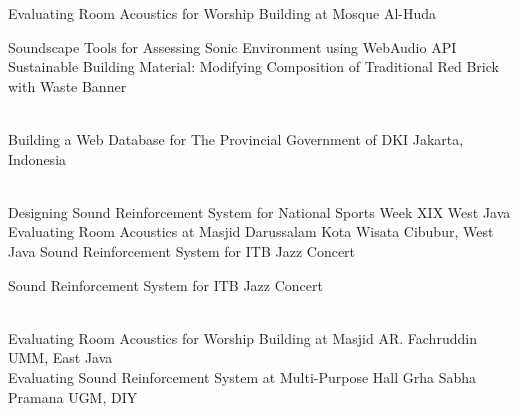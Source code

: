 \documentclass[]{style}
\begin{document}
 Evaluating Room Acoustics for Worship Building at Mosque Al-Huda \\
\sectionsep

 Soundscape Tools for Assessing Sonic Environment using WebAudio API \hfill{} \\
 Sustainable Building Material: Modifying Composition of Traditional Red Brick with Waste Banner \\
\sectionsep

\hfill{} \\
 Building a Web Database for The Provincial Government of DKI Jakarta, Indonesia\\
\sectionsep

\hfill{}\\
 Designing Sound Reinforcement System for National Sports Week XIX West Java\\
 Evaluating Room Acoustics at Masjid Darussalam Kota Wisata Cibubur, West Java
 Sound Reinforcement System for ITB Jazz Concert
\sectionsep

 Sound Reinforcement System for ITB Jazz Concert \hfill{}
\sectionsep

\hfill{}\\
 Evaluating Room Acoustics for Worship Building at Masjid AR. Fachruddin UMM, East Java\\
 Evaluating Sound Reinforcement System at Multi-Purpose Hall Grha Sabha Pramana UGM, DIY
\sectionsep



\end{document}
